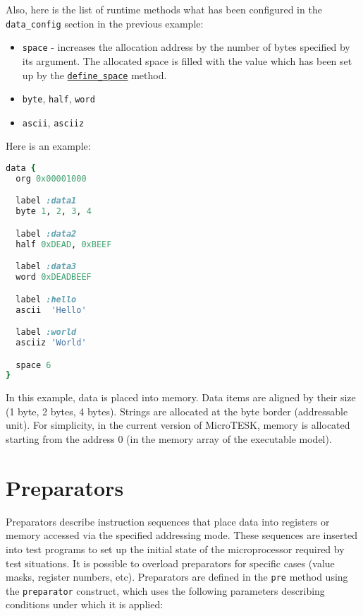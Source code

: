 \documentclass[oneside,final,12pt]{extreport}
\begin{document}
Also, here is the list of runtime methods what has been configured in the \texttt{data{\_}config}
section in the previous example:

\begin{itemize}
\item \texttt{space} - increases the allocation address by the number of bytes specified by
      its argument. The allocated space is filled with the value which has been set up by
      the \hyperref[define_space]{\texttt{define{\_}space}} method.
\item \texttt{byte}, \texttt{half}, \texttt{word}
\item \texttt{ascii}, \texttt{asciiz}
\end{itemize}

Here is an example:

\begin{lstlisting}[language=ruby]
data {
  org 0x00001000

  label :data1
  byte 1, 2, 3, 4

  label :data2
  half 0xDEAD, 0xBEEF

  label :data3
  word 0xDEADBEEF

  label :hello
  ascii  'Hello'

  label :world
  asciiz 'World'

  space 6
}
\end{lstlisting}

In this example, data is placed into memory. Data items are aligned by their size
(1 byte, 2 bytes, 4 bytes). Strings are allocated at the byte border (addressable
unit). For simplicity, in the current version of MicroTESK, memory is allocated
starting from the address 0 (in the memory array of the executable model).


\section{Preparators}

Preparators describe instruction sequences that place data into registers or memory
accessed via the specified addressing mode. These sequences are inserted into test programs to
set up the initial state of the microprocessor required by test situations. It is possible to
overload preparators for specific cases (value masks, register numbers, etc).
Preparators are defined in the {\tt pre} method using the {\tt preparator} construct, which uses
the following parameters describing conditions under which it is applied:
\end{document}
